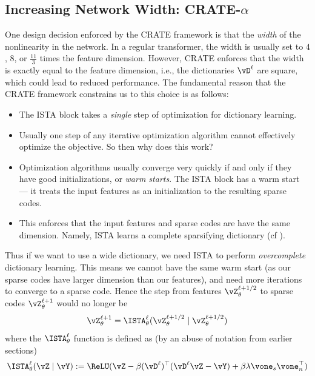 \documentclass[../../book-main.tex]{subfiles}
\begin{document}
\subsection{Increasing Network Width: CRATE-\(\alpha\)}\label{sub:crate_alpha_experiments}

One design decision enforced by the CRATE framework is that the \textit{width} of the nonlinearity in the network. In a regular transformer, the width is usually set to \(4\), \(8\), or \(\frac{11}{3}\) times the feature dimension. However, CRATE enforces that the width is exactly equal to the feature dimension, i.e., the dictionaries \(\vD^{\ell}\) are square, which could lead to reduced performance. The fundamental reason that the CRATE framework constrains us to this choice is as follows:
\begin{itemize}
    \item The ISTA block takes a \textit{single} step of optimization for dictionary learning.
    \item Usually one step of any iterative optimization algorithm cannot effectively optimize the objective. So then why does this work?
    \item Optimization algorithms usually converge very quickly if and only if they have good initializations, or \textit{warm starts}. The ISTA block has a warm start --- it treats the input features as an initialization to the resulting sparse codes.
    \item This enforces that the input features and sparse codes are have the same dimension. Namely, ISTA learns a complete sparsifying dictionary (cf ).
\end{itemize}
Thus if we want to use a wide dictionary, we need ISTA to perform \textit{overcomplete} dictionary learning. This means we cannot have the same warm start (as our sparse codes have larger dimension than our features), and need more iterations to converge to a sparse code. Hence the step from features \(\vZ_{\theta}^{\ell + 1/2}\) to sparse codes \(\vZ_{\theta}^{\ell + 1}\) would no longer be 
\begin{equation}
    \vZ_{\theta}^{\ell + 1} = \ISTA_{\theta}^{\ell}(\vZ_{\theta}^{\ell + 1/2} \mid \vZ_{\theta}^{\ell + 1/2})
\end{equation}
where the \(\ISTA_{\theta}^{\ell}\) function is defined as (by an abuse of notation from earlier sections)
\begin{equation}
    \ISTA_{\theta}^{\ell}(\vZ \mid \vY) := \ReLU(\vZ - \beta (\vD^{\ell})^{\top}(\vD^{\ell}\vZ - \vY) + \beta \lambda \vone_{s}\vone_{n}^{\top})
\end{equation}
\end{document}

